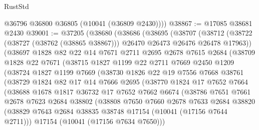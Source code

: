 \begin{lexlean}{RustStd}
\begin{coremodule}
        @36796
        @36800
        @36805
        (@10041 (@36809 @2430))))
@38867 := @17085 @38681 @2430
@39001 := @37205
    (@38680
      (@38686
        (@38695
          (@38707
            (@38712 (@38722 (@38727 (@38762 (@38865 @38867))) @26470 @26473 @26476 @26478 @17963))
            (@38697
              @1828
              @82
              @22
              @14
              @7671
              @2711
              @2695
              @2678
              @7615
              @2684
              (@38709
                @1828
                @22
                @7671
                (@38715
                  @1827
                  @1199
                  @22
                  @2711
                  @7669
                  @2450
                  @1209
                  (@38724
                    @1827
                    @1199
                    @7669
                    (@38730
                      @1826
                      @22
                      @19
                      @7556
                      @7668
                      @38761
                      (@38729
                        @1824
                        @82
                        @17
                        @14
                        @7666
                        @2695
                        (@38770
                          @1824
                          @17
                          @7652
                          @7664
                          (@38688
                            @1678
                            @1817
                            @36732
                            @17
                            @7652
                            @7662
                            @6674
                            (@38786
                              @7651
                              @7661
                              @2678
                              @7623
                              @2684
                              @38802
                              (@38808
                                @7650
                                @7660
                                @2678
                                @7633
                                @2684
                                @38820
                                (@38829
                                  @7643
                                  @2684
                                  @38835
                                  @38748
                                  @17154
                                  (@10041 (@17156 @7644 @2711)))
                                @17154
                                (@10041 (@17156 @7634 @7650)))

\end{coremodule}
\end{lexlean}
